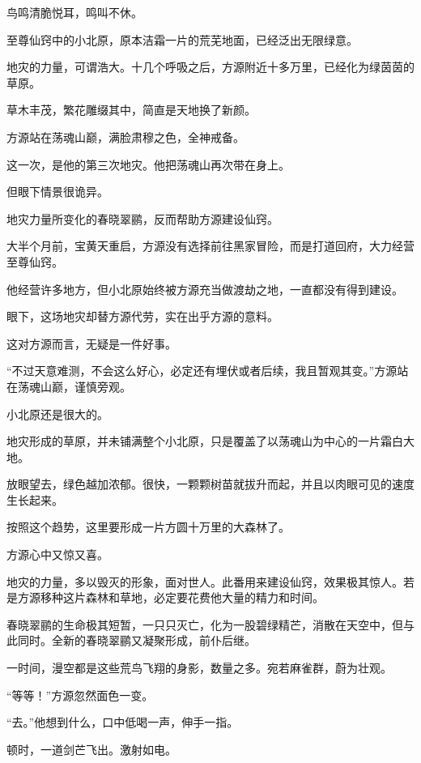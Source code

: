 
\begin{this_body}



鸟鸣清脆悦耳，鸣叫不休。

至尊仙窍中的小北原，原本洁霜一片的荒芜地面，已经泛出无限绿意。

地灾的力量，可谓浩大。十几个呼吸之后，方源附近十多万里，已经化为绿茵茵的草原。

草木丰茂，繁花雕缀其中，简直是天地换了新颜。

方源站在荡魂山巅，满脸肃穆之色，全神戒备。

这一次，是他的第三次地灾。他把荡魂山再次带在身上。

但眼下情景很诡异。

地灾力量所变化的春晓翠鹂，反而帮助方源建设仙窍。

大半个月前，宝黄天重启，方源没有选择前往黑家冒险，而是打道回府，大力经营至尊仙窍。

他经营许多地方，但小北原始终被方源充当做渡劫之地，一直都没有得到建设。

眼下，这场地灾却替方源代劳，实在出乎方源的意料。

这对方源而言，无疑是一件好事。

“不过天意难测，不会这么好心，必定还有埋伏或者后续，我且暂观其变。”方源站在荡魂山巅，谨慎旁观。

小北原还是很大的。

地灾形成的草原，并未铺满整个小北原，只是覆盖了以荡魂山为中心的一片霜白大地。

放眼望去，绿色越加浓郁。很快，一颗颗树苗就拔升而起，并且以肉眼可见的速度生长起来。

按照这个趋势，这里要形成一片方圆十万里的大森林了。

方源心中又惊又喜。

地灾的力量，多以毁灭的形象，面对世人。此番用来建设仙窍，效果极其惊人。若是方源移种这片森林和草地，必定要花费他大量的精力和时间。

春晓翠鹂的生命极其短暂，一只只灭亡，化为一股碧绿精芒，消散在天空中，但与此同时。全新的春晓翠鹂又凝聚形成，前仆后继。

一时间，漫空都是这些荒鸟飞翔的身影，数量之多。宛若麻雀群，蔚为壮观。

“等等！”方源忽然面色一变。

“去。”他想到什么，口中低喝一声，伸手一指。

顿时，一道剑芒飞出。激射如电。


\end{this_body}
